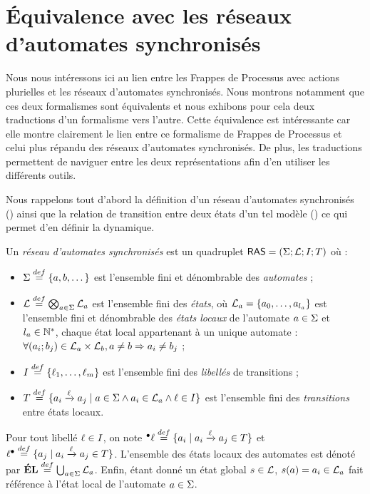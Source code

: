 
\section{Équivalence avec les réseaux d'automates synchronisés}

Nous nous intéressons ici au lien entre les Frappes de Processus avec actions plurielles
et les réseaux d'automates synchronisés.
Nous montrons notamment que ces deux formalismes sont équivalents
et nous exhibons pour cela deux traductions d'un formalisme vers l'autre.
Cette équivalence est intéressante car elle montre clairement le lien entre ce formalisme
de Frappes de Processus et celui plus répandu des réseaux d'automates synchronisés.
De plus, les traductions permettent de naviguer entre les deux représentations
afin d'en utiliser les différents outils.

Nous rappelons tout d'abord la définition d'un réseau d'automates synchronisés ()
ainsi que la relation de transition entre deux états d'un tel modèle ()
ce qui permet d'en définir la dynamique.

\begin{definition}
  Un \emph{réseau d'automates synchronisés} est un quadruplet $\mathsf{RAS} = (\Sigma; \mathcal{L}; I; T)$
  où :
  \begin{itemize}
    \item $\Sigma \stackrel{def}= \{a, b, \dots\}$ est l'ensemble fini et dénombrable des \emph{automates} ;
    \item $\mathcal{L} \stackrel{def}= \bigotimes_{a \in \Sigma} \mathcal{L}_a$ est l'ensemble fini des \emph{états},
      où $\mathcal{L}_a = \{a_0, \ldots, a_{l_a}\}$ est l'ensemble fini et dénombrable
      des \emph{états locaux} de l'automate $a \in \Sigma$ et $l_a \in \mathbb{N}^*$,
      chaque état local appartenant à un unique automate :
      $\forall (a_i; b_j) \in \mathcal{L}_a \times \mathcal{L}_b, a \neq b \Rightarrow a_i \neq b_j$ ;
    \item $I \stackrel{def}= \{\ell_1, \dots, \ell_m\}$ est l'ensemble fini des
      \emph{libellés} de transitions ;
    \item $T \stackrel{def}= \{ a_i \xrightarrow{\ell} a_j \mid a \in \Sigma \wedge a_i \in \mathcal{L}_a \wedge
      \ell \in I \}$ est l'ensemble fini des \emph{transitions} entre états locaux.
  \end{itemize}
  Pour tout libellé $\ell \in I$, on note
  ${}^\bullet \ell \stackrel{def}= \{ a_i \mid a_i \xrightarrow{\ell} a_j \in T \}$
  et $\ell {}^\bullet \stackrel{def}= \{ a_j \mid a_i \xrightarrow{\ell} a_j \in T \}$.
  L'ensemble des états locaux des automates est dénoté par
  $\mathbf{\acute{E}L} \stackrel{def}= \bigcup_{a \in \Sigma} \mathcal{L}_a$.
  Enfin, étant donné un état global $s \in \mathcal{L}$, $s(a) = a_i \in \mathcal{L}_a$
  fait référence à l'état local de l'automate $a \in \Sigma$.
\end{definition}

